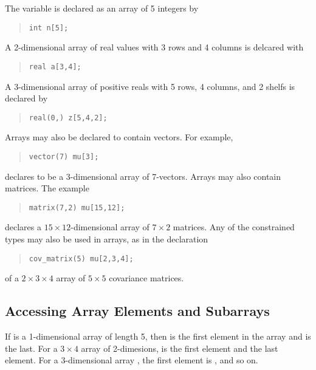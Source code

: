 The variable  is declared as an array of 5 integers by
%
\begin{quote}
\begin{Verbatim}  
int n[5];
\end{Verbatim}
\end{quote}
% 
A 2-dimensional array of real values with 3 rows and 4 columns is
delcared with
%
\begin{quote}
\begin{Verbatim}  
real a[3,4];
\end{Verbatim}
\end{quote}
% 
A 3-dimensional array  of positive reals with 5 rows, 4
columns, and 2 shelfs is declared by
%
\begin{quote}
\begin{Verbatim} 
real(0,) z[5,4,2];
\end{Verbatim}
\end{quote}
%

Arrays may also be declared to contain vectors.  For example,
%
\begin{quote}
\begin{Verbatim}  
vector(7) mu[3];
\end{Verbatim}
\end{quote}
% 
declares  to be a 3-dimensional array of 7-vectors.  
Arrays may also contain matrices.  The example
%
\begin{quote}
\begin{Verbatim} 
matrix(7,2) mu[15,12];
\end{Verbatim}
\end{quote}
%
declares a $15 \times 12$-dimensional array of $7 \times 2$ matrices.
Any of the constrained types may also be used in arrays, as in the
declaration
%
\begin{quote}
\begin{Verbatim}  
cov_matrix(5) mu[2,3,4];
\end{Verbatim}
\end{quote}
% 
of a $2 \times 3 \times 4$ array of $5 \times 5$ covariance matrices.

\subsection{Accessing Array Elements and Subarrays}

If  is a 1-dimensional array of length 5, then  is
the first element in the array and  is the last.  For a $3
\times 4$ array  of 2-dimesions,  is the first
element and  the last element.  For a 3-dimensional
array , the first element is , and so on.

